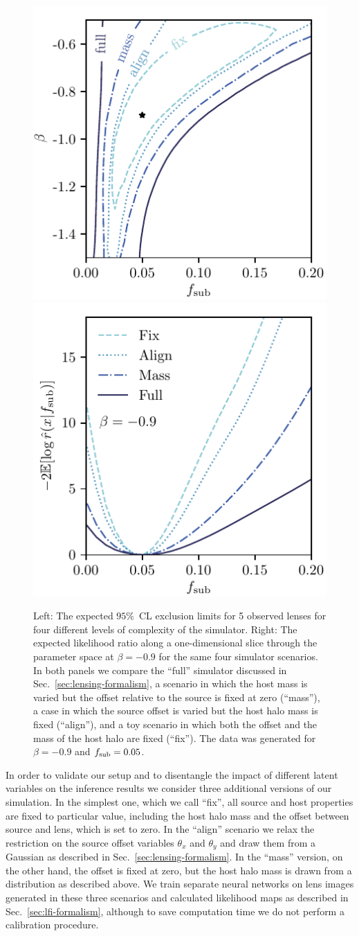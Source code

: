 \documentclass[twocolumn]{aastex62}
\begin{document}
\begin{figure}
\centering
\includegraphics[height=0.4\textwidth]{figures/scenarios_2d}%
\hspace*{0.052\textwidth}\hspace*{0.075\textwidth}%
\includegraphics[height=0.4\textwidth]{figures/scenarios_1d}%
\hspace*{0.052\textwidth}%
\caption{Left: The expected $95\%$~CL exclusion limits for 5 observed lenses for four different levels of complexity of the simulator. Right: The expected likelihood ratio along a one-dimensional slice through the parameter space at $\beta = -0.9$ for the same four simulator scenarios. In both panels we compare the ``full'' simulator discussed in Sec.~\ref{sec:lensing-formalism}, a scenario in which the host mass is varied but the offset relative to the source is fixed at zero (``mass''), a case in which the source offset is varied but the host halo mass is fixed (``align''), and a toy scenario in which both the offset and the mass of the host halo are fixed (``fix''). The data was generated for $\beta = -0.9$ and $f_{\mathrm{sub}} = 0.05$.}
\label{fig:scenarios}
\end{figure}

In order to validate our setup and to disentangle the impact of different latent variables on the inference results we consider three additional versions of our simulation. In the simplest one, which we call ``fix'', all source and host properties are fixed to particular value, including the host halo mass and the offset between source and lens, which is set to zero. In the ``align'' scenario we relax the restriction on the source offset variables $\theta_x$ and $\theta_y$ and draw them from a Gaussian as described in Sec.~\ref{sec:lensing-formalism}. In the ``mass'' version, on the other hand, the offset is fixed at zero, but the host halo mass is drawn from a distribution as described above. We train separate neural networks on lens images generated in these three scenarios and calculated likelihood maps as described in Sec.~\ref{sec:lfi-formalism}, although to save computation time we do not perform a calibration procedure.
\end{document}
